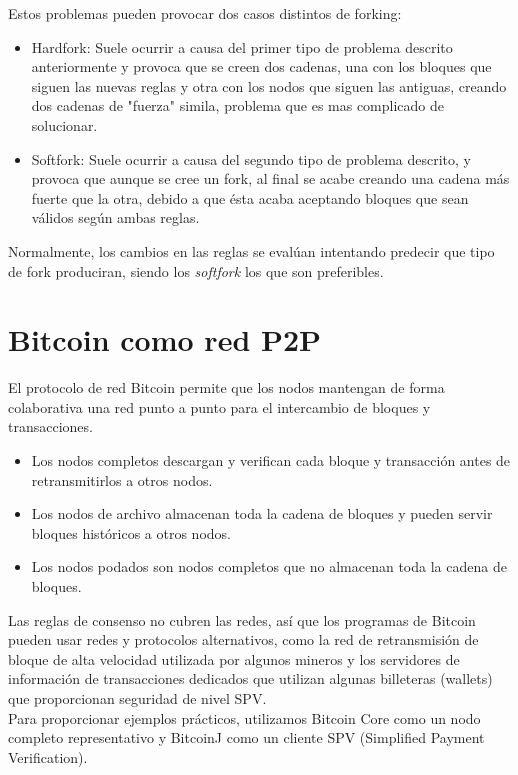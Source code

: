 \documentclass[11pt,a4paper]{article}
\begin{document}
Estos problemas pueden provocar dos casos distintos de forking:
\begin{itemize}
    \item Hardfork: Suele ocurrir a causa del primer tipo de problema descrito anteriormente y provoca que se creen dos cadenas, una con los bloques que siguen las nuevas reglas y otra con los nodos que siguen las antiguas, creando dos cadenas de "fuerza" simila, problema que es mas complicado de solucionar.
	\item Softfork: Suele ocurrir a causa del segundo tipo de problema descrito, y provoca que aunque se cree un fork, al final se acabe creando una cadena más fuerte que la otra, debido a que ésta acaba aceptando bloques que sean válidos según ambas reglas.
\end{itemize}

Normalmente, los cambios en las reglas se evalúan intentando predecir que tipo de fork produciran, siendo los \emph{softfork} los que son preferibles.

\section{Bitcoin como red P2P}

El protocolo de red Bitcoin permite que los nodos mantengan de forma colaborativa una red punto a punto para el intercambio de bloques y transacciones.

\begin{itemize}
	\item Los nodos completos descargan y verifican cada bloque y transacción antes de retransmitirlos a otros nodos.
	\item Los nodos de archivo almacenan toda la cadena de bloques y pueden servir bloques históricos a otros nodos.
	\item Los nodos podados son nodos completos que no almacenan toda la cadena de bloques.
\end{itemize}

Las reglas de consenso no cubren las redes, así que los programas de Bitcoin pueden usar redes y protocolos alternativos, como la red de retransmisión de bloque de alta velocidad utilizada por algunos mineros y los servidores de información de transacciones dedicados que utilizan algunas billeteras (wallets) que proporcionan seguridad de nivel SPV.\\

Para proporcionar ejemplos prácticos, utilizamos Bitcoin Core como un nodo completo representativo y BitcoinJ como un cliente SPV (Simplified Payment Verification).
\end{document}
